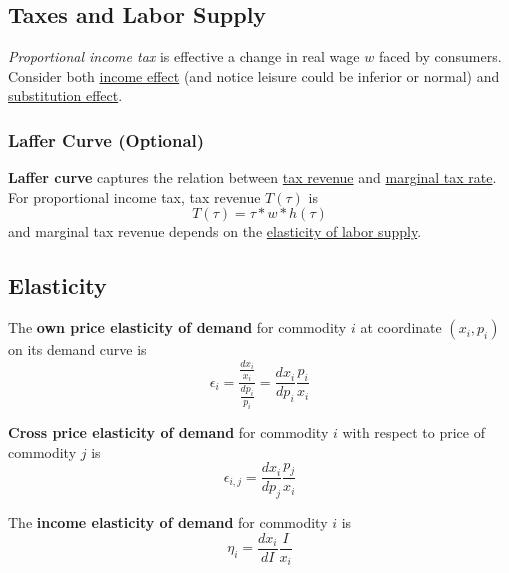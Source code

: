 \documentclass[]{article}
\begin{document}
        \subsection{Taxes and Labor Supply}
            \begin{remark}
                \emph{Proportional income tax} is effective a change in real wage $w$ faced by consumers. Consider both \ul{income effect} (and notice leisure could be inferior or normal) and \ul{substitution effect}. 
            \end{remark}
            
            \subsubsection{Laffer Curve (Optional)}
                \begin{definition}
                    \textbf{Laffer curve} captures the relation between \ul{tax revenue} and \ul{marginal tax rate}. For proportional income tax, tax revenue $T(\tau)$ is
                    \[
                        T(\tau) = \tau*w*h(\tau)
                    \]
                    and marginal tax revenue depends on the \ul{elasticity of labor supply}.
                \end{definition}
                
        \subsection{Elasticity}
            \begin{definition}
                The \textbf{own price elasticity of demand} for commodity $i$ at coordinate $(x_i, p_i)$ on its demand curve is 
                \[
                    \epsilon_i = \frac{
                        \frac{dx_i}{x_i}
                        }{
                        \frac{dp_i}{p_i}
                        }
                    = \frac{dx_i}{dp_i} \frac{p_i}{x_i}
                \]
            \end{definition}
            
            \begin{definition}
                \textbf{Cross price elasticity of demand} for commodity $i$ with respect to price of commodity $j$ is 
                \[
                    \epsilon_{i,j} = \frac{dx_i}{dp_j}\frac{p_j}{x_i}
                \]
            \end{definition}
            
            \begin{definition}
                The \textbf{income elasticity of demand} for commodity $i$ is
                \[
                    \eta_{i} = \frac{dx_i}{dI}\frac{I}{x_i}
                \]
            \end{definition}
            
\end{document}
